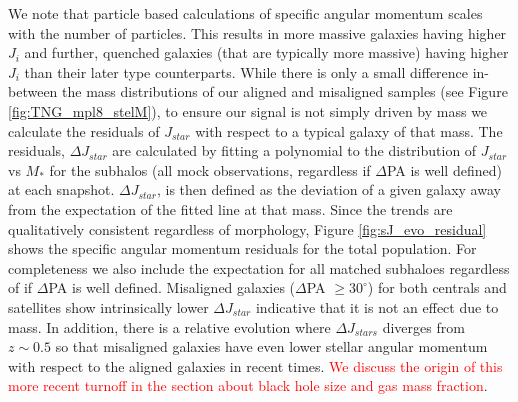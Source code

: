 \documentclass[fleqn,usenatbib]{mnras}
\newcommand{\red}[1]{{\textcolor{red}{#1}}}
\begin{document}
We note that particle based calculations of specific angular momentum scales with the number of particles. This results in more massive galaxies having higher $J_{i}$ and further, quenched galaxies (that are typically more massive) having higher $J_{i}$ than their later type counterparts. While there is only a small difference in-between the mass distributions of our aligned and misaligned samples (see Figure \ref{fig:TNG_mpl8_stelM}), to ensure our signal is not simply driven by mass we calculate the residuals of $J_{star}$ with respect to a typical galaxy of that mass. The residuals, $\Delta J_{star}$ are calculated by fitting a polynomial to the distribution of $J_{star}$ vs $M_{\ast}$ for the subhalos (all mock observations, regardless if $\Delta$PA is well defined) at each snapshot. $\Delta J_{star}$, is then defined as the deviation of a given galaxy away from the expectation of the fitted line at that mass. Since the trends are qualitatively consistent regardless of morphology, Figure \ref{fig:sJ_evo_residual} shows the specific angular momentum residuals for the total population. For completeness we also include the expectation for all matched subhaloes regardless of if $\Delta$PA is well defined. Misaligned galaxies ($\Delta$PA $\geq 30^{\circ}$) for both centrals and satellites show intrinsically lower $\Delta J_{star}$ indicative that it is not an effect due to mass. In addition, there is a relative evolution where $\Delta J_{stars}$ diverges from $z \sim 0.5$ so that misaligned galaxies have even lower stellar angular momentum with respect to the aligned galaxies in recent times. \red{We discuss the origin of this more recent turnoff in the section about black hole size and gas mass fraction}.
\end{document}
